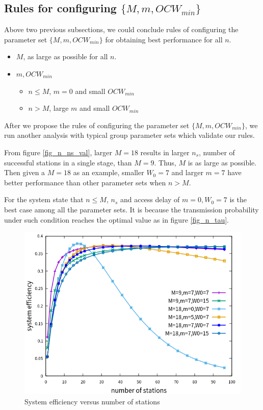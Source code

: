 \subsection{Rules for configuring $\lbrace M,m,OCW_{min} \rbrace$}
Above two previous subsections, we could conclude rules of configuring the parameter set $\lbrace M, m, OCW_{min} \rbrace$ for obtaining best performance for all $n$. 
\begin{itemize}
\item $M$, as large as possible for all $n$.
\item $m, OCW_{min}$
	\begin{itemize}
	\item $n \leq M$, $m = 0$ and small $OCW_{min}$ 
	\item $n > M$, large $m$ and small $OCW_{min}$
	\end{itemize}
\end{itemize}

After we propose the rules of configuring the parameter set $\lbrace M, m, OCW_{min} \rbrace$, we run another analysis with typical group parameter sets which validate our rules.

From figure \ref{fig_n_ns_val}, larger $M = 18$  results in larger $n_s$, number of successful stations in a single stage, than $M=9$. Thus, $M$ is as large as possible.
Then given a $M=18$ as an example, smaller $W_0 = 7$ and larger $m = 7$ have better performance than other parameter sets when $n>M$.

For the system state that $n\leq M$, $n_s$ and access delay of $m=0,W_0 = 7$ is the best case among all the parameter sets. It is because the transmission probability under such condition reaches the optimal value as in figure \ref{fig_n_tau}.  

\begin{figure}[!ht]
\includegraphics[scale=.54]{./figure/n_rule_eff_perf.png}
\caption{System efficiency versus number of stations}
\label{fig_n_eff_val}
\end{figure}

